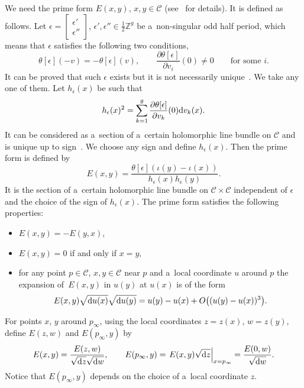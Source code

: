 \documentclass[10pt,a4paper]{amsart}
\numberwithin{equation}{section}
\theoremstyle{definition}
\begin{document}
We need the prime form $E(x,y)$, $x,y\in {\mathcal C}$ (see~\cite{Fay1973,KNTY1988,MumfordII} for details). It is defined as follows. Let $\epsilon=
\left[\begin{smallmatrix}
\epsilon'\\ \epsilon''
\end{smallmatrix}\right]$, $\epsilon',\epsilon''\in\frac{1}{2} {\mathbb Z}^g$ be a~non-singular odd half period, which means that $\epsilon$ satisfies the following
two conditions,
\[
\theta[\epsilon](-v)=-\theta[\epsilon](v),
\qquad
\frac{\partial \theta[\epsilon]}{\partial v_i}(0)\neq 0 \qquad \text{for some $i$}.
\]
It can be proved that such $\epsilon$ exists but it is not necessarily unique~\cite{Fay1973,MumfordII}.
We take any one of them.
Let $h_\epsilon(x)$ be such that
\[
 h_\epsilon(x)^2=\sum_{k=1}^g \frac{\partial \theta[\epsilon]}{\partial v_k}(0){\rm d}v_k(x).
 \]
 It can be considered as a~section of a~certain
holomorphic line bundle on ${\mathcal C}$ and is unique up to sign~\cite{Fay1973}.
We choose any sign and define
$h_\epsilon(x)$.
Then the prime form is defined by
\[
E(x,y)=\frac{\theta[\epsilon](\iota(y)-\iota(x))}{h_\epsilon(x)h_\epsilon(y)}.
\]
It is the section of a~certain holomorphic line bundle on ${\mathcal C}\times{\mathcal C}$ independent of $\epsilon$ and the choice of the sign of $h_\epsilon(x)$.
The prime form satisfies the following properties:
\begin{itemize}\itemsep=0pt
\item[(i)] $E(x,y)=-E(y,x)$,
\item[(ii)] $E(x,y)=0$ if and only if $x=y$,
\item[(iii)] for any point $p\in{\mathcal C}$, $x,y\in {\mathcal C}$ near $p$ and a~local coordinate $u$ around $p$ the expansion of~$E(x,y)$ in $u(y)$ at $u(x)$ is of the form
\begin{gather*}
E(x,y)\sqrt{{\rm d}u(x)}\sqrt{{\rm d}u(y)}=u(y)-u(x)+O\bigl((u(y)-u(x))^3\bigr).
\end{gather*}
\end{itemize}

For points $x$, $y$ around $p_\infty$,
using the local coordinates $z=z(x)$, $w=z(y)$,
 define $E(z,w)$ and $E(p_\infty,y)$ by
\begin{gather*}
E(x,y)=\frac{E(z,w)}{\sqrt{{\rm d}z}\sqrt{{\rm d}w}},
\qquad
E(p_\infty,y)=\left.E(x,y)\sqrt{{\rm d}z}\right|_{x=p_\infty}=\frac{E(0,w)}{\sqrt{{\rm d}w}}.
\end{gather*}
Notice that $E(p_\infty,y)$ depends on the choice of a~local coordinate $z$.
\end{document}
